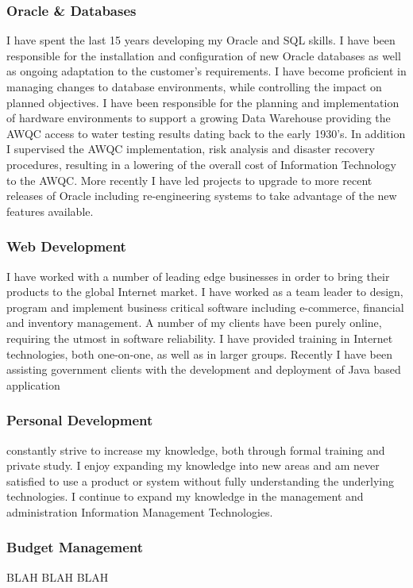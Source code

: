 \documentclass[]{friggeri-cv} %
\begin{document}
\subsubsection*{Oracle \& Databases}
I have spent the last 15 years developing my Oracle and SQL skills. I have been responsible for the installation and configuration of new Oracle databases as well as ongoing adaptation to the customer’s requirements. I have become proficient in managing changes to database environments, while controlling the impact on planned objectives. I have been responsible for the planning and implementation of hardware environments to support a growing Data Warehouse providing the AWQC access to water testing results dating back to the early 1930’s. In addition I supervised the AWQC implementation, risk analysis and disaster recovery procedures, resulting in a lowering of the overall cost of Information Technology to the AWQC. More recently I have led projects to upgrade to more recent releases of Oracle including re-engineering systems to take advantage of the new features available.

\subsubsection*{Web Development}
I have worked with a number of leading edge businesses in order to bring their products to the global Internet market. I have worked as a team leader to design, program and implement business critical software including e-commerce, financial and inventory management. A number of my clients have been purely online, requiring the utmost in software reliability. I have provided training in Internet technologies, both one-on-one, as well as in larger groups. Recently I have been assisting government clients with the development and deployment of Java based application

\subsubsection*{Personal Development}
constantly strive to increase my knowledge, both through formal training and private study. I enjoy expanding my knowledge into new areas and am never satisfied to use a product or system without fully understanding the underlying technologies. I continue to expand my knowledge in the management and administration Information Management Technologies.

\subsubsection{Budget Management}
BLAH BLAH BLAH
\end{document}

